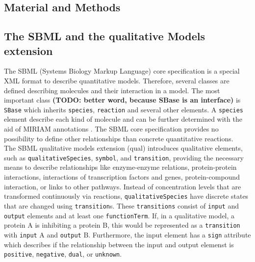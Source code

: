 \documentclass{bioinfo}
\begin{document}
\begin{methods}
\section{Material and Methods}
\subsection{The SBML and the qualitative Models extension}
The SBML (Systems Biology Markup Language) core specification is a special XML format to describe quantitative models. Therefore, several classes are defined describing molecules and their interaction in a model. 
The most important class \textbf{(TODO: better word, because SBase is an interface)} is \texttt{SBase} which inherits \texttt{species}, \texttt{reaction} and several other elements. 
A \texttt{species} element describe each kind of molecule and can be further determined with the aid of MIRIAM annotations \citep{Juty2012}.
The SBML core specification provides no possibility to define other relationships than concrete quantitative reactions. \citep{Hucka2003}\\
The SBML qualitative models extension (qual) introduces qualitative elements, such as \texttt{qualitativeSpecies}, \texttt{symbol}, and \texttt{transition}, providing the necessary means to describe relationships like enzyme-enzyme relations, protein-protein interactions, interactions of transcription factors and genes, protein-compound interaction, or links to other pathways.
Instead of concentration levels that are transformed continuously via reactions, \texttt{qualitativeSpecies} have discrete states that are changed using \texttt{transition}s.
These \texttt{transitions} consist of \texttt{input} and \texttt{output} elements and at least one \texttt{functionTerm}.
If, in a qualitative model, a protein A is inhibiting a protein B, this would be represented as a \texttt{transition} with \texttt{input} A and \texttt{output} B.
Furthermore, the input element has a \texttt{sign} attribute which describes if the relationship between the input and output elemenst is \texttt{positive}, \texttt{negative}, \texttt{dual}, or \texttt{unknown}.

\end{methods}
\end{document}
